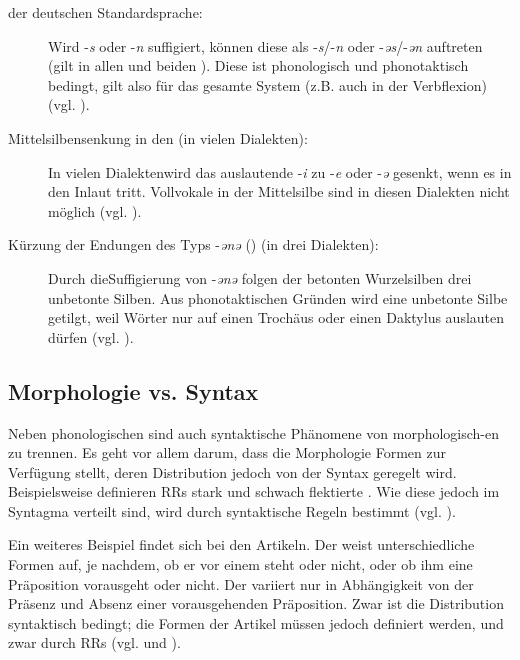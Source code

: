 \begin{description}
\item[ der deutschen Standardsprache:] Wird -\textit{s} oder -\textit{n} suffigiert, können diese  als -\textit{s}/-\textit{n} oder -\textit{əs}/-\textit{ən} auftreten (gilt in allen  und beiden ). Diese  ist phonologisch und phonotaktisch bedingt, gilt also für das gesamte System (z.B. auch in der Verbflexion) (vgl. ).
\item[Mittelsilbensenkung in den  (in vielen Dialekten):] In vielen Dialekten\linebreak wird das auslautende -\textit{i} zu -\textit{e} oder -\textit{ə} gesenkt, wenn es in den Inlaut tritt. Vollvokale in der Mittelsilbe sind in diesen Dialekten nicht möglich (vgl. ).
\item[Kürzung der Endungen des Typs -\textit{ən}\textit{ə} () (in drei Dialekten):] Durch die\linebreak Suffigierung von -\textit{ən}\textit{ə} folgen der betonten Wurzelsilben drei unbetonte Silben. Aus phonotaktischen Gründen wird eine unbetonte Silbe getilgt, weil Wörter nur auf einen Trochäus oder einen Daktylus auslauten dürfen (vgl. ).
\end{description}

\subsection{Morphologie vs. Syntax}\label{5.7.2}

Neben phonologischen sind auch syntaktische Phänomene von morphologisch-\linebreak en zu trennen. Es geht vor allem darum, dass die Morphologie Formen zur Verfügung stellt, deren Distribution jedoch von der Syntax geregelt wird. Beispielsweise definieren RRs stark und schwach flektierte . Wie diese jedoch im Syntagma verteilt sind, wird durch syntaktische Regeln bestimmt (vgl. ).

Ein weiteres Beispiel findet sich bei den Artikeln. Der  weist unterschiedliche Formen auf, je nachdem, ob er vor einem  steht oder nicht, oder ob ihm eine Präposition vorausgeht oder nicht. Der  variiert nur in Abhängigkeit von der Präsenz und Absenz einer vorausgehenden Präposition. Zwar ist die Distribution syntaktisch bedingt; die Formen der Artikel müssen jedoch definiert werden, und zwar durch RRs (vgl.  und ).

